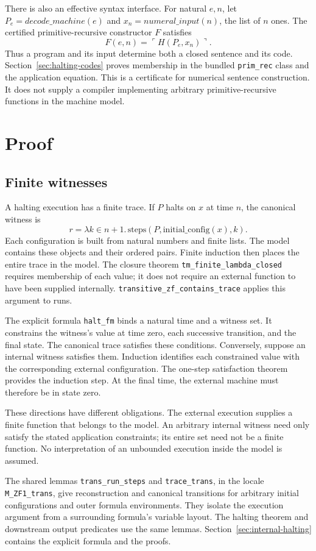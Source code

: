 \documentclass[11pt,a4paper]{article}
\newcommand{\theoremname}[1]{{\urlstyle{tt}\nolinkurl{#1}}}
\begin{document}
There is also an effective syntax interface. For natural $e,n$, let
$P_e=\mathit{decode\_machine}(e)$ and
$x_n=\mathit{numeral\_input}(n)$, the list of $n$ ones. The certified
primitive-recursive constructor $F$ satisfies
\[
  F(e,n)=\ulcorner H(P_e,x_n)\urcorner.
\]
Thus a program and its input determine both a closed sentence and its
code. Section~\ref{sec:halting-codes} proves membership in the bundled
\texttt{prim\_rec} class and the application equation.
This is a certificate for numerical sentence construction. It does not
supply a compiler implementing arbitrary primitive-recursive functions
in the machine model.

\section{Proof}
\subsection{Finite witnesses}
A halting execution has a finite trace. If $P$ halts on $x$ at time $n$,
the canonical witness is
\[
  r=\lambda k\in n+1.\,\mathrm{steps}(P,\mathrm{initial\_config}(x),k).
\]
Each configuration is built from natural numbers and finite lists.
The model contains these objects and their ordered pairs. Finite induction
then places the entire trace in the model. The closure theorem
\theoremname{tm_finite_lambda_closed} requires membership of each value;
it does not require an external function to have been supplied internally.
\theoremname{transitive_zf_contains_trace} applies this argument to runs.

The explicit formula \theoremname{halt_fm} binds a natural time and a
witness set. It constrains the witness's value at time zero, each
successive transition, and the final state. The canonical trace satisfies
these conditions. Conversely, suppose an internal witness satisfies them.
Induction identifies each constrained value with the corresponding
external configuration. The one-step satisfaction theorem provides the
induction step. At the final time, the external machine must therefore
be in state zero.

These directions have different obligations. The external execution
supplies a finite function that belongs to the model. An arbitrary
internal witness need only satisfy the stated application constraints;
its entire set need not be a finite function. No interpretation of an
unbounded execution inside the model is assumed.

The shared lemmas \theoremname{trans_run_steps} and
\theoremname{trace_trans}, in the locale \texttt{M\_ZF1\_trans}, give
reconstruction and canonical transitions for arbitrary initial
configurations and outer formula environments. They isolate the
execution argument from a surrounding formula's variable layout.
The halting theorem and downstream output predicates use the same
lemmas. Section~\ref{sec:internal-halting} contains the explicit formula
and the proofs.
\end{document}
